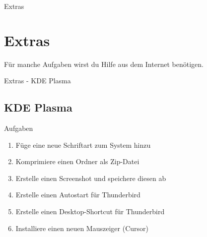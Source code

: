 
\begin{frame}{Extras}
    \section{Extras}\label{sec:extras}
    \pause
    Für manche Aufgaben wirst du Hilfe aus dem Internet benötigen.

\end{frame}

\begin{frame}{Extras - KDE Plasma}
    \subsection{KDE Plasma}\label{subsec:kde plasma}

    \begin{alertblock}{Aufgaben}
        \begin{enumerate} \pause
            \item Füge eine neue Schriftart zum System hinzu\pause
            \item Komprimiere einen Ordner als Zip-Datei\pause
            \item Erstelle einen Screenshot und speichere diesen ab\pause
            \item Erstelle einen Autostart für Thunderbird\pause
            \item Erstelle einen Desktop-Shortcut für Thunderbird\pause
            \item Installiere einen neuen Mauszeiger (Cursor)
        \end{enumerate}

    \end{alertblock}

\end{frame}



